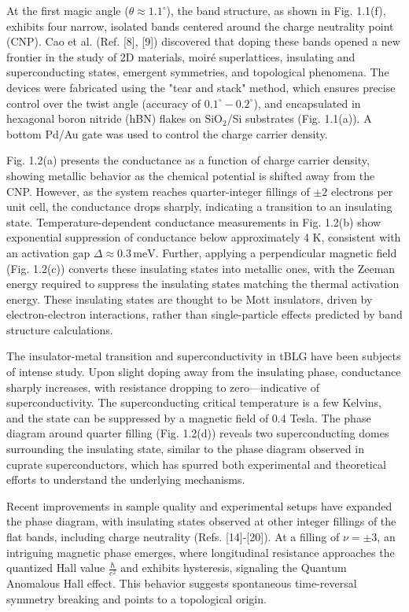 At the first magic angle (\(\theta \approx 1.1^\circ\)), the band structure, as shown in Fig. 1.1(f), exhibits four narrow, isolated bands centered around the charge neutrality point (CNP). Cao et al. (Ref. [8], [9]) discovered that doping these bands opened a new frontier in the study of 2D materials, moiré superlattices, insulating and superconducting states, emergent symmetries, and topological phenomena. The devices were fabricated using the "tear and stack" method, which ensures precise control over the twist angle (accuracy of \(0.1^\circ - 0.2^\circ\)), and encapsulated in hexagonal boron nitride (hBN) flakes on SiO\(_2\)/Si substrates (Fig. 1.1(a)). A bottom Pd/Au gate was used to control the charge carrier density.

Fig. 1.2(a) presents the conductance as a function of charge carrier density, showing metallic behavior as the chemical potential is shifted away from the CNP. However, as the system reaches quarter-integer fillings of \(\pm 2\) electrons per unit cell, the conductance drops sharply, indicating a transition to an insulating state. Temperature-dependent conductance measurements in Fig. 1.2(b) show exponential suppression of conductance below approximately 4 K, consistent with an activation gap \(\Delta \approx 0.3 \, \text{meV}\). Further, applying a perpendicular magnetic field (Fig. 1.2(c)) converts these insulating states into metallic ones, with the Zeeman energy required to suppress the insulating states matching the thermal activation energy. These insulating states are thought to be Mott insulators, driven by electron-electron interactions, rather than single-particle effects predicted by band structure calculations.

The insulator-metal transition and superconductivity in tBLG have been subjects of intense study. Upon slight doping away from the insulating phase, conductance sharply increases, with resistance dropping to zero—indicative of superconductivity. The superconducting critical temperature is a few Kelvins, and the state can be suppressed by a magnetic field of 0.4 Tesla. The phase diagram around quarter filling (Fig. 1.2(d)) reveals two superconducting domes surrounding the insulating state, similar to the phase diagram observed in cuprate superconductors, which has spurred both experimental and theoretical efforts to understand the underlying mechanisms.

Recent improvements in sample quality and experimental setups have expanded the phase diagram, with insulating states observed at other integer fillings of the flat bands, including charge neutrality (Refs. [14]-[20]). At a filling of \(\nu = \pm 3\), an intriguing magnetic phase emerges, where longitudinal resistance approaches the quantized Hall value \(\frac{\hbar}{e^2}\) and exhibits hysteresis, signaling the Quantum Anomalous Hall effect. This behavior suggests spontaneous time-reversal symmetry breaking and points to a topological origin.

